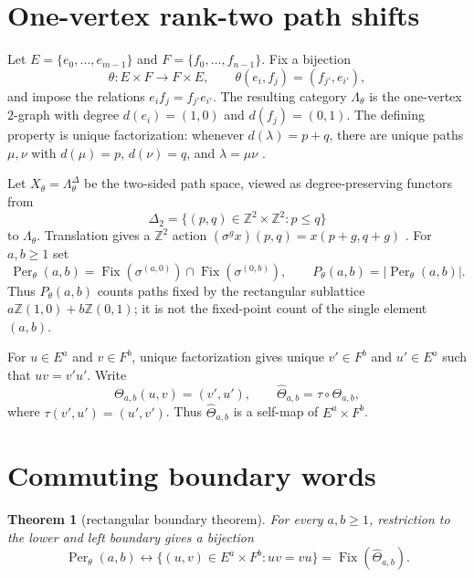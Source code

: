 \documentclass[11pt,a4paper]{amsart}
\newtheorem{theorem}{Theorem}[section]
\theoremstyle{definition}
\theoremstyle{remark}
\newcommand{\Z}{\mathbb Z}
\newcommand{\Per}{\operatorname{Per}}
\newcommand{\Fix}{\operatorname{Fix}}
\begin{document}
\section{One-vertex rank-two path shifts}

Let $E=\{e_0,\ldots,e_{m-1}\}$ and
$F=\{f_0,\ldots,f_{n-1}\}$.  Fix a bijection
\[
 \theta:E\times F\longrightarrow F\times E,
 \qquad \theta(e_i,f_j)=(f_{j'},e_{i'}),
\]
and impose the relations $e_if_j=f_{j'}e_{i'}$.  The resulting category
$\Lambda_\theta$ is the one-vertex $2$-graph with degree
$d(e_i)=(1,0)$ and $d(f_j)=(0,1)$.  The defining property is unique
factorization: whenever $d(\lambda)=p+q$, there are unique paths $\mu,\nu$
with $d(\mu)=p$, $d(\nu)=q$, and $\lambda=\mu\nu$
\cite{KumjianPask2000}.

Let $X_\theta=\Lambda_\theta^\Delta$ be the two-sided path space, viewed as
degree-preserving functors from
\[
 \Delta_2=\{(p,q)\in\Z^2\times\Z^2:p\leq q\}
\]
to $\Lambda_\theta$.  Translation gives a $\Z^2$ action
$(\sigma^g x)(p,q)=x(p+g,q+g)$ \cite{KumjianPask2003}.  For $a,b\geq1$ set
\[
 \Per_\theta(a,b)=
 \Fix(\sigma^{(a,0)})\cap\Fix(\sigma^{(0,b)}),
 \qquad P_\theta(a,b)=|\Per_\theta(a,b)|.
\]
Thus $P_\theta(a,b)$ counts paths fixed by the rectangular sublattice
$a\Z(1,0)+b\Z(0,1)$; it is not the fixed-point count of the single element
$(a,b)$.

For $u\in E^a$ and $v\in F^b$, unique factorization gives unique
$v'\in F^b$ and $u'\in E^a$ such that $uv=v'u'$.  Write
\[
 \Theta_{a,b}(u,v)=(v',u'),
 \qquad
 \widehat\Theta_{a,b}=\tau\circ\Theta_{a,b},
\]
where $\tau(v',u')=(u',v')$.  Thus $\widehat\Theta_{a,b}$ is a self-map of
$E^a\times F^b$.

\section{Commuting boundary words}

\begin{theorem}[rectangular boundary theorem]\label{thm:boundary}
For every $a,b\geq1$, restriction to the lower and left boundary gives a
bijection
\[
 \Per_\theta(a,b)
 \longleftrightarrow
 \{(u,v)\in E^a\times F^b:uv=vu\}
 =\Fix(\widehat\Theta_{a,b}).
\]
\end{theorem}
\end{document}
